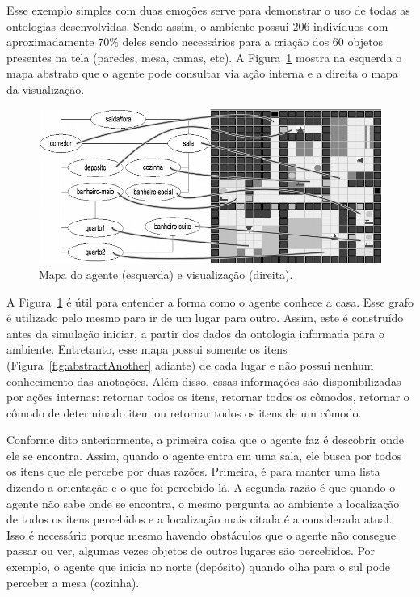 Esse exemplo simples com duas emoções serve para demonstrar o uso de todas as
ontologias desenvolvidas. Sendo assim, o ambiente possui 206 indivíduos com
aproximadamente 70\% deles sendo necessários para a criação dos 60 objetos
presentes na tela (paredes, mesa, camas, etc). A
Figura~\ref{fig:abstractWindow} mostra na esquerda o mapa abstrato que o agente
pode consultar via ação interna e a direita o mapa da visualização.

\begin{figure}
	\begin{center}
		\includegraphics[width=140mm]{figuras/visualization.png}
	\end{center}
	\caption{Mapa do agente (esquerda) e visualização (direita).}
	\label{fig:abstractWindow}
\end{figure}

A Figura~\ref{fig:abstractWindow} é útil para entender a forma como o agente
conhece a casa. Esse grafo é utilizado pelo mesmo para ir de um lugar para
outro. Assim, este é construído antes da simulação iniciar, a partir dos dados
da ontologia informada para o ambiente. Entretanto, esse mapa possui somente
os itens (Figura~\ref{fig:abstractAnother} adiante) de cada lugar e não possui nenhum conhecimento das anotações.
Além disso, essas informações são disponibilizadas por ações
internas: retornar todos os itens, retornar todos os cômodos, retornar o
cômodo de determinado item ou retornar todos os itens de um cômodo.

Conforme dito anteriormente, a primeira coisa que o agente faz é descobrir
onde ele se encontra. Assim, quando o agente entra em uma sala, ele busca por
todos os itens que ele percebe por duas razões. Primeira, é para manter uma
lista dizendo a orientação e o que foi percebido lá. A segunda razão é que
quando o agente não sabe onde se encontra, o mesmo pergunta ao ambiente a
localização de todos os itens percebidos e a localização mais citada é a
considerada atual. Isso é necessário porque mesmo havendo obstáculos que o
agente não consegue passar ou ver, algumas vezes objetos de outros lugares são
percebidos. Por exemplo, o agente que inicia no norte (depósito) quando olha
para o sul pode perceber a mesa (cozinha).

